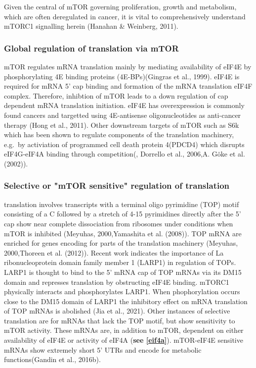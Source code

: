 \documentclass[12pt,openany]{book}
\begin{document}
Given the central of mTOR governing proliferation, growth and
metabolism, which are often deregulated in cancer, it is vital to
comprehensively understand mTORC1 signalling herein (Hanahan \&
Weinberg, 2011).

\subsubsection{Global regulation of translation via mTOR}

mTOR regulates mRNA translation mainly by mediating availability of
eIF4E by phosphorylating 4E binding proteins (4E-BPs)(Gingras et al.,
1999). eIF4E is required for mRNA 5' cap binding and formation of the
mRNA translation eIF4F complex. Therefore, inhibtion of mTOR leads to a
down regulation of cap dependent mRNA translation initiation. eIF4E has
overexpression is commonly found cancers and targetted using
4E-antisense oligonucleotides as anti-cancer therapy (Hong et al.,
2011). Other downstream targets of mTOR such as S6k which has been shown
to regulate components of the translation machinery, e.g.~by activiation
of programmed cell death protein 4(PDCD4) which disrupts eIF4G-eIF4A
binding through competition(, Dorrello et al., 2006,A. Göke et al.
(2002)).

\subsubsection{Selective or "mTOR sensitive" regulation of translation}

translation involves transcripts with a terminal oligo pyrimidine (TOP)
motif consisting of a C followed by a stretch of 4-15 pyrimidines
directly after the 5' cap show near complete dissociation from ribosomes
under conditions when mTOR is inhibited (Meyuhas, 2000,Yamashita et al.
(2008)). TOP mRNA are enriched for genes encoding for parts of the
translation machinery (Meyuhas, 2000,Thoreen et al. (2012)). Recent work
indicates the importance of La ribonucleoprotein domain family member 1
(LARP1) in regulation of TOPs. LARP1 is thought to bind to the 5' mRNA
cap of TOP mRNAs via its DM15 domain and represses translation by
obstructing eIF4E binding. mTORC1 physically interacts and
phosphorylates LARP1. When phophorylation occurs close to the DM15
domain of LARP1 the inhibitory effect on mRNA translation of TOP mRNAs
is abolished (Jia et al., 2021). Other instances of selective
translation are for mRNAs that lack the TOP motif, but show sensitivity
to mTOR activity. These mRNAs are, in addition to mTOR, dependent on
either availability of eIF4E or activity of eIF4A (\textbf{see
\ref{eif4a}}). mTOR-eIF4E sensitive mRNAs show extremely short 5' UTRs
and encode for metabolic functions(Gandin et al., 2016b).
\end{document}
